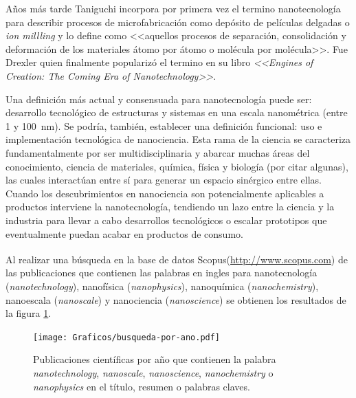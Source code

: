 	Años más tarde Taniguchi incorpora por primera vez el termino nanotecnología para describir procesos de microfabricación como depósito de películas delgadas o \textit{ion millling} y lo define como <<aquellos procesos de separación, consolidación y deformación de los materiales átomo por átomo o molécula por molécula>>. \cite{taniguchi1974} Fue Drexler quien finalmente popularizó el termino en su libro \textit{<<Engines of Creation: The Coming Era of Nanotechnology>>}\cite{drexler1987}. 

	Una definición más actual y consensuada para nanotecnología puede ser: desarrollo tecnológico de estructuras y sistemas en una escala nanométrica (entre 1 y \SI{100}{\nm}). Se podría, también, establecer una definición funcional: uso e implementación tecnológica de nanociencia. Esta rama de la ciencia se caracteriza fundamentalmente por ser multidisciplinaria y abarcar muchas áreas del conocimiento, ciencia de materiales, química, física y biología (por citar algunas), las cuales interactúan entre sí para generar un espacio sinérgico entre ellas. Cuando los descubrimientos en nanociencia son potencialmente aplicables a productos interviene la nanotecnología, tendiendo un lazo entre la ciencia y la industria para llevar a cabo desarrollos tecnológicos o escalar prototipos que eventualmente puedan acabar en productos de consumo.
	
	Al realizar una búsqueda en la base de datos Scopus\textsuperscript\textregistered (\url{http://www.scopus.com}) de las publicaciones que contienen las palabras en ingles para nanotecnología (\textit{nanotechnology}), nanofísica (\textit{nanophysics}), nanoquímica (\textit{nanochemistry}), nanoescala (\textit{nanoscale}) y nanociencia (\textit{nanoscience}) se obtienen los resultados de la figura \ref{fig:publicaciones-ano}. 

 			\begin{figure}[ht!]
 			\begin{center}
 			\texttt{[image: Graficos/busqueda-por-ano.pdf]}
 			\vspace*{-1cm}
 			\caption[Publicaciones por año en nanotecnología]{Publicaciones científicas por año que contienen la palabra \textit{nanotechnology}, \textit{nanoscale}, \textit{nanoscience}, \textit{nanochemistry} o \textit{nanophysics} en el título, resumen o palabras claves.}
 			\label{fig:publicaciones-ano} 		    
 			\end{center}
 		    \vspace*{-0.5cm}
 			\end{figure}
	
